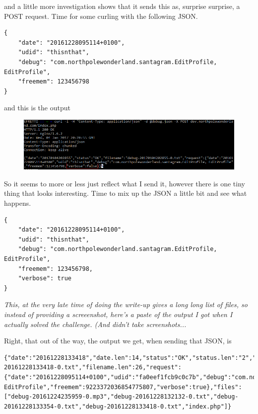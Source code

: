 \documentclass[writeup.tex]{subfiles}
\begin{document}
			and a little more investigation shows that it sends this as, surprise surprise, a POST request. Time for some curling with the following JSON.
			
			\begin{lstlisting}[columns=fullflexible,breaklines]
{
	"date": "20161228095114+0100",
	"udid": "thisnthat",
	"debug": "com.northpolewonderland.santagram.EditProfile, EditProfile",
	"freemem": 123456798
}
			\end{lstlisting}
			and this is the output
			\begin{figure}[H]
				\centering
				\includegraphics[width=\linewidth]{"screenshots/pwns/Site 3 - curl 1"}
			\end{figure}
			
			So it seems to more or less just reflect what I send it, however there is one tiny thing that looks interesting. Time to mix up the JSON a little bit and see what happens.

			\begin{lstlisting}[columns=fullflexible,breaklines]
{
	"date": "20161228095114+0100",
	"udid": "thisnthat",
	"debug": "com.northpolewonderland.santagram.EditProfile, EditProfile",
	"freemem": 123456798,
	"verbose": true
}
			\end{lstlisting}
			
			\textit{This, at the very late time of doing the write-up gives a long long list of files, so instead of providing a screeenshot, here's a paste of the output I got when I actually solved the challenge. (And didn't take screenshots...}
			
			Right, that out of the way, the output we get, when sending that JSON, is
			
			\begin{lstlisting}[columns=fullflexible,breaklines]
{"date":"20161228133418","date.len":14,"status":"OK","status.len":"2","filename":"debug-20161228133418-0.txt","filename.len":26,"request":{"date":"20161228095114+0100","udid":"fa0eef1fcb9c0c7b","debug":"com.northpolewonderland.santagram.EditProfile, EditProfile","freemem":9223372036854775807,"verbose":true},"files":["debug-20161224235959-0.mp3","debug-20161228132132-0.txt","debug-20161228133354-0.txt","debug-20161228133418-0.txt","index.php"]}
			\end{lstlisting}
			
\end{document}
